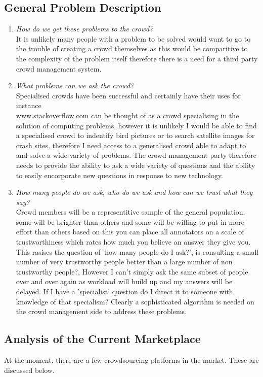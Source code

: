 \documentclass[11pt]{article}
\begin{document}
\subsection{General Problem Description}
\begin{enumerate}
\item
\emph{How do we get these problems to the crowd?} 
\\
It is unlikely many people with a problem to be solved would want to go to the trouble
of creating a crowd themselves as this would be comparitive to the complexity of the problem itself therefore there is a need for a third party
crowd management system. 
\item
\emph{What problems can we ask the crowd?} 
\\
Specialised crowds have been successful and certainly have their uses for instance\\
www.stackoverflow.com can be thought of as a crowd specialising in the solution of computing problems, however it is unlikely I would
be able to find a specialised crowd to indentify bird pictures or to search satellite images for crash sites, therefore I need access 
to a generalised crowd able to adapt to and solve a wide variety of problems. The crowd management party therefore needs to provide
the ability to ask a wide variety of questions and the ability to easily encorporate new questions in response to new technology. %
\item
\emph{How many people do we ask, who do we ask and how can we trust what they say?} 
\\
Crowd members will be a representitive sample of the general 
population, some will be brighter than others and some will be willing to put in more effort than others based on this you can place all 
annotators on a scale of trustworthiness which rates how much you believe an answer they give you. This rasises the question of 'how many 
people do I ask?', is consulting a small number of very trustworthy people better than a large number of non trustworthy people?, However I 
can't simply ask the same subset of people over and over again as workload will build up and my answers will be delayed. If I have a 
'specialist' question do I direct it to someone with knowledge of that specialism? Clearly a sophisticated algorithm is needed on the crowd
management side to address these problems. 
\end{enumerate}


\subsection{Analysis of the Current Marketplace}
At the moment, there are a few crowdsourcing platforms in the market. These
are discussed below.
\end{document}
